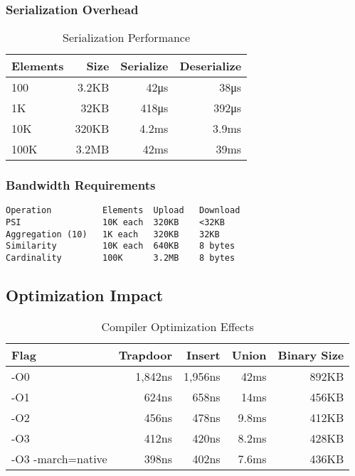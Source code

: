 \documentclass[../main_comprehensive.tex]{subfiles}
\begin{document}
\subsubsection{Serialization Overhead}

\begin{table}[h]
\centering
\caption{Serialization Performance}
\begin{tabular}{lrrr}
\toprule
Elements & Size & Serialize & Deserialize \\
\midrule
100 & 3.2KB & 42μs & 38μs \\
1K & 32KB & 418μs & 392μs \\
10K & 320KB & 4.2ms & 3.9ms \\
100K & 3.2MB & 42ms & 39ms \\
\bottomrule
\end{tabular}
\end{table}

\subsubsection{Bandwidth Requirements}

\begin{lstlisting}[language={},basicstyle=\scriptsize\ttfamily,frame=single]
Operation          Elements  Upload   Download
PSI                10K each  320KB    <32KB
Aggregation (10)   1K each   320KB    32KB
Similarity         10K each  640KB    8 bytes
Cardinality        100K      3.2MB    8 bytes
\end{lstlisting}

\subsection{Optimization Impact}

\begin{table}[h]
\centering
\caption{Compiler Optimization Effects}
\begin{tabular}{lrrrr}
\toprule
Flag & Trapdoor & Insert & Union & Binary Size \\
\midrule
-O0 & 1,842ns & 1,956ns & 42ms & 892KB \\
-O1 & 624ns & 658ns & 14ms & 456KB \\
-O2 & 456ns & 478ns & 9.8ms & 412KB \\
-O3 & 412ns & 420ns & 8.2ms & 428KB \\
-O3 -march=native & 398ns & 402ns & 7.6ms & 436KB \\
\bottomrule
\end{tabular}
\end{table}
\end{document}
